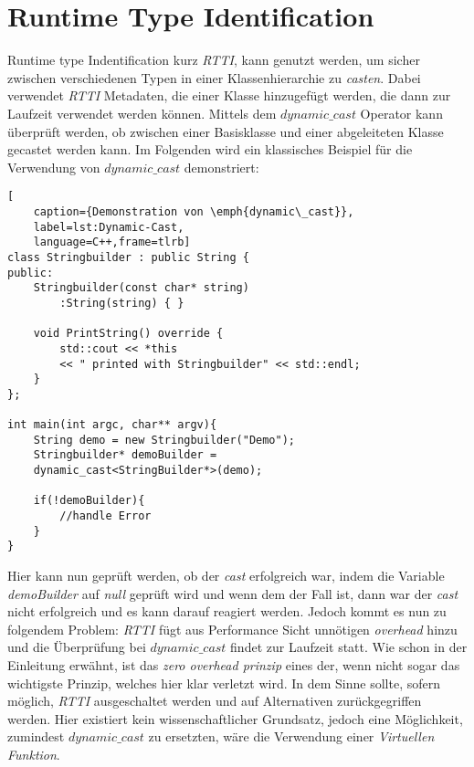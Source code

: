 \section{Runtime Type Identification}\label{sec:rtti}
Runtime type Indentification kurz \emph{RTTI}, kann genutzt werden, um sicher zwischen
verschiedenen Typen in einer Klassenhierarchie zu \emph{casten}. Dabei verwendet \emph{RTTI}
Metadaten, die einer Klasse hinzugefügt werden, die dann zur Laufzeit verwendet werden können.
Mittels dem \emph{$dynamic\_cast$} Operator kann überprüft werden, ob zwischen einer Basisklasse
und einer abgeleiteten Klasse gecastet werden kann. Im Folgenden wird ein klassisches Beispiel
für die Verwendung von \emph{$dynamic\_cast$} demonstriert:
\begin{lstlisting}[
    caption={Demonstration von \emph{dynamic\_cast}},
    label=lst:Dynamic-Cast,
    language=C++,frame=tlrb]
class Stringbuilder : public String {
public:
	Stringbuilder(const char* string)
		:String(string) { }

    void PrintString() override {
    	std::cout << *this
       	<< " printed with Stringbuilder" << std::endl;
    }
};

int main(int argc, char** argv){
	String demo = new Stringbuilder("Demo");
	Stringbuilder* demoBuilder =
	dynamic_cast<StringBuilder*>(demo);

	if(!demoBuilder){
		//handle Error
	}
}
\end{lstlisting}

Hier kann nun geprüft werden, ob der \emph{cast} erfolgreich war, indem die Variable
\emph{demoBuilder} auf \emph{null} geprüft wird und wenn dem der Fall ist, dann war der
\emph{cast} nicht erfolgreich und es kann darauf reagiert werden.
\newline
\newline
Jedoch kommt es nun zu folgendem Problem: \emph{RTTI} fügt aus Performance Sicht unnötigen
\emph{overhead} hinzu und die Überprüfung bei \emph{$dynamic\_cast$} findet zur Laufzeit statt.
Wie schon in der Einleitung erwähnt, ist das \emph{zero overhead prinzip} eines der, wenn nicht
sogar das wichtigste Prinzip, welches hier klar verletzt wird. In dem Sinne sollte, sofern
möglich, \emph{RTTI} ausgeschaltet werden und auf Alternativen zurückgegriffen werden. Hier
existiert kein wissenschaftlicher Grundsatz, jedoch eine Möglichkeit, zumindest
\emph{$dynamic\_cast$} zu ersetzten, wäre die Verwendung einer \emph{Virtuellen Funktion}.